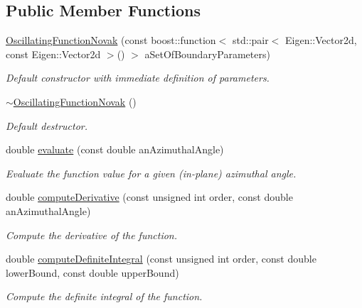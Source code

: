 \subsection*{Public Member Functions}
\begin{DoxyCompactItemize}
\item 
\hyperlink{classtudat_1_1mission__segments_1_1OscillatingFunctionNovak_a2ad7eec25cc8fd85af87dca564544afb}{Oscillating\+Function\+Novak} (const boost\+::function$<$ std\+::pair$<$ Eigen\+::\+Vector2d, const Eigen\+::\+Vector2d $>$() $>$ a\+Set\+Of\+Boundary\+Parameters)
\begin{DoxyCompactList}\small\item\em Default constructor with immediate definition of parameters. \end{DoxyCompactList}\item 
\hyperlink{classtudat_1_1mission__segments_1_1OscillatingFunctionNovak_acbdd7fcee056d0b6433dbe909e24cd89}{$\sim$\+Oscillating\+Function\+Novak} ()
\begin{DoxyCompactList}\small\item\em Default destructor. \end{DoxyCompactList}\item 
double \hyperlink{classtudat_1_1mission__segments_1_1OscillatingFunctionNovak_a3d0ac0b2d7a09ed14894740fab68a0e6}{evaluate} (const double an\+Azimuthal\+Angle)
\begin{DoxyCompactList}\small\item\em Evaluate the function value for a given (in-\/plane) azimuthal angle. \end{DoxyCompactList}\item 
double \hyperlink{classtudat_1_1mission__segments_1_1OscillatingFunctionNovak_ab6a7579fe3bed9a3901140f9e58d004c}{compute\+Derivative} (const unsigned int order, const double an\+Azimuthal\+Angle)
\begin{DoxyCompactList}\small\item\em Compute the derivative of the function. \end{DoxyCompactList}\item 
double \hyperlink{classtudat_1_1mission__segments_1_1OscillatingFunctionNovak_ac8f56d30994eb778970c8b7d2b9a4568}{compute\+Definite\+Integral} (const unsigned int order, const double lower\+Bound, const double upper\+Bound)
\begin{DoxyCompactList}\small\item\em Compute the definite integral of the function. \end{DoxyCompactList}\end{DoxyCompactItemize}


